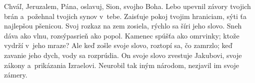 Chváľ, Jeruzalem, Pána,
oslavuj, Sion, svojho Boha.
\versseparator
Lebo upevnil závory tvojich brán
a~požehnal tvojich synov v~tebe.
\versseparator
Zaisťuje pokoj tvojim hraniciam,
sýti ťa najlepšou pšenicou.
\versseparator
Svoj rozkaz na zem zosiela,
rýchlo sa šíri jeho slovo.
\versseparator
Sneh dáva ako vlnu,
rozsýpasrieň ako popol.
\versseparator
Kamenec spúšťa ako omrvinky;
ktože vydrží v~jeho mraze?
\versseparator
Ale keď zošle svoje slovo, roztopí sa, čo zamrzlo;
keď zavanie jeho dych, vody sa rozprúdia.
\versseparator
On svoje slovo zvestuje Jakubovi,
svoje zákony a~prikázania Izraelovi.
\versseparator
Neurobil tak iným národom,
nezjavil im svoje zámery.